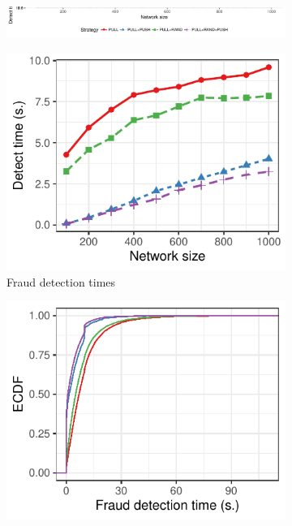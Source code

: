 \begin{figure}[t]
	\centering
	\begin{subfigure}{\columnwidth}
		\centering
		\includegraphics[width=\linewidth]{trustchain/assets/fraud_experiments_legend}
	\end{subfigure}
	\begin{subfigure}{.66\columnwidth}
		\centering
		\includegraphics[width=\linewidth]{trustchain/assets/fraud_experiment_fixed_tx}
		\caption{Fraud detection times}
		\label{fig:fraud_experiment_fixed_tx_time}
	\end{subfigure}%
	\begin{subfigure}{.66\columnwidth}
		\centering
		\includegraphics[width=\columnwidth]{trustchain/assets/fraud_experiment_detect_times_fixed_1000}

\end{subfigure}
\end{figure}
